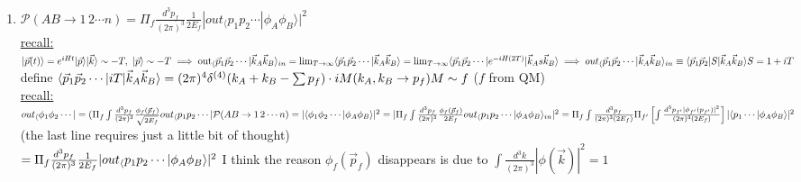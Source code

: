\documentclass[12pt]{amsart}
\begin{document}
\begin{enumerate}
\item \underline{$\mathcal{P} (AB \rightarrow 1\, 2 \cdots n)= \Pi_f \frac{d^3 p_f}{(2 \pi)^3} \frac{1}{2E_f} | {out}_\langle p_1 p_2 \cdots | \phi_A \phi_B \rangle |^2$}\\
\underline{recall:} $| \vec{p}(t) \rangle = e^{i H t} | \vec{p} \rangle\\
| \vec{k} \rangle \sim - T,\,\, | \vec{p} \rangle \sim - T\\
\implies {\rm{out}}_\langle \vec{p}_1 \vec{p}_2 \cdots | \vec{k}_A \vec{k}_B \rangle_{in}= \lim_{T \rightarrow \infty} \langle \vec{p}_1 \vec{p}_2 \cdots | \vec{k}_A \vec{k}_B \rangle = \lim_{T \rightarrow \infty} \langle \vec{p}_1 \vec{p}_2 \cdots | e^{- i H(2 T)} | \vec{k}_As \vec{k}_B \rangle\\
\implies {out}_\langle \vec{p}_1 \vec{p}_2 \cdots | \vec{k}_A \vec{k}_B \rangle_{in} \equiv \langle \vec{p}_1 \vec{p}_2 | S | \vec{k}_A \vec{k}_B \rangle\\
S = 1 + i T\\$
define $\langle \vec{p}_1 \vec{p}_2 \cdots | i T | \vec{k}_A \vec{k}_B \rangle = (2 \pi)^4 \delta^{(4)} ( k_A + k_B - \sum p_f) \cdot i M(k_A, k_B \rightarrow p_f)\\
M \sim f$ ($f$ from QM)\\
\underline{recall:} $out_\langle \phi_1 \phi_2 \cdots | = ( \Pi_f \int \frac{d^3 p_f}{(2 \pi)^3} \frac{\phi_f(\vec{p}_f)}{\sqrt{2 E_f}} out_\langle p_1 p_2 \cdots |\\
\mathcal{P} (AB \rightarrow 1\, 2 \cdots n)= | \langle \phi_1 \phi_2 \cdots | \phi_A \phi_B \rangle|^2\\
= | \Pi_f \int \frac{d^3 p_f}{(2 \pi)^3} \frac{\phi_f(\vec{p}_f)}{2 E_f} out_\langle p_1 p_2 \cdots | \phi_A \phi_B \rangle_{in}|^2\\
= \Pi_f \int \frac{d^3 p_f}{(2 \pi)^3 (2 E_f)} \Pi_{f'} \left [ \int \frac{d^3 p_{f'} | \phi_{f'} (p_{f'})|^2}{(2 \pi)^3 (2 E_f)} \right ] | \langle p_1 \cdots | \phi_A \phi_B \rangle |^2\\$
(the last line requires just a little bit of thought)\\
$
= \Pi_f \frac{d^3 p_f}{(2 \pi)^3} \frac{1}{2E_f} | {out}_\langle p_1 p_2 \cdots | \phi_A \phi_B \rangle |^2\\$
I think the reason $\phi_f( \vec{p}_f)$ disappears is due to $\int \frac{d^3k}{(2 \pi)^3} | \phi(\vec{k})|^2=1$\\


\hdashrule[0.5ex][c]{\linewidth}{0.5pt}{1.5mm}


\end{enumerate}
\end{document}
